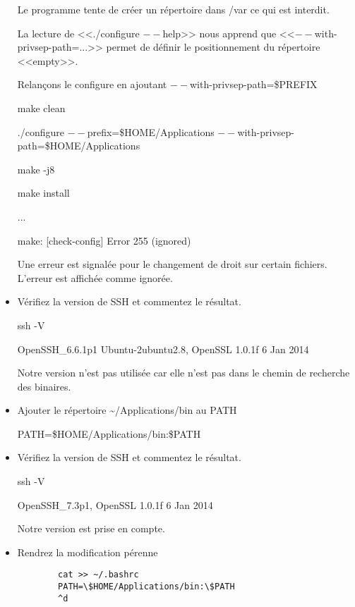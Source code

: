 \documentclass[11pt]{article}
\begin{document}
\begin{itemize}
\begin{solution}
		Le programme tente de créer un répertoire dans /var ce qui est interdit.
		
		La lecture de <<./configure $--$help>> nous apprend que <<$--$with-privsep-path=...>> permet de définir le positionnement du répertoire <<empty>>.
		
		Relançons le configure en ajoutant $--$with-privsep-path=\$PREFIX
		
		make clean
		
		./configure $--$prefix=\$HOME/Applications $--$with-privsep-path=\$HOME/Applications
		
		make -j8
		
		make install
		
		...
		
		make: [check-config] Error 255 (ignored)
		
		Une erreur est signalée pour le changement de droit sur certain fichiers. L'erreur est affichée comme ignorée.
		
	\end{solution}
	\item Vérifiez la version de SSH et commentez le résultat.
	\begin{solution}
		
		ssh -V
		
		OpenSSH\_6.6.1p1 Ubuntu-2ubuntu2.8, OpenSSL 1.0.1f 6 Jan 2014
		
		Notre version n'est pas utilisée car elle n'est pas dans le chemin de recherche des binaires.
		
	\end{solution}
	
	\item Ajouter le répertoire \textasciitilde{}/Applications/bin au PATH
	\begin{solution}
		
		PATH=\$HOME/Applications/bin:\$PATH
	\end{solution}
	
	\item Vérifiez la version de SSH et commentez le résultat.
	\begin{solution}
		
		ssh -V
		
		OpenSSH\_7.3p1, OpenSSL 1.0.1f 6 Jan 2014
		
		Notre version est prise en compte.
	\end{solution}
	\item Rendrez la modification pérenne
	\begin{solution}
		\begin{lstlisting}
		cat >> ~/.bashrc
		PATH=\$HOME/Applications/bin:\$PATH
		^d
		\end{lstlisting}
	\end{solution}
\end{itemize}
\end{document}
